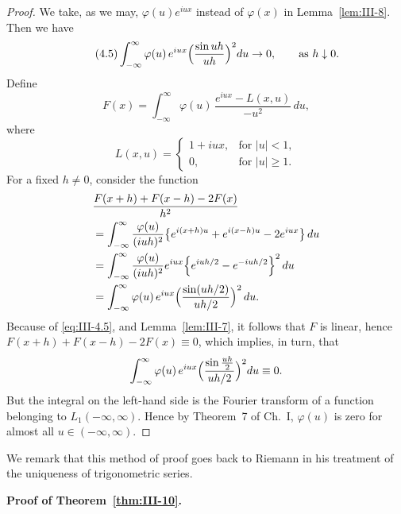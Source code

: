 \begin{proof}
We take, as we may, $\varphi(u)e^{iux}$ instead of $\varphi(x)$ in Lemma~\ref{lem:III-8}. Then we have
\begin{equation}\tag{4.5}\label{eq:III-4.5}
\int_{-\infty}^{\infty}\varphi(u)\,e^{iux}\Bigl(\frac{\sin uh}{uh}\Bigr)^{2}du\to0,\qquad\text{as }h\downarrow0.
\end{equation}
Define
\[
F(x)=\int_{-\infty}^{\infty}\varphi(u)\,\frac{e^{iux}-L(x,u)}{-u^{2}}\,du,
\]
where
\[
L(x,u)=
\begin{cases}
1+iux,&\text{for }|u|<1,\\
0,&\text{for }|u|\ge1.
\end{cases}
\]
For a fixed $h\neq0$, consider the function
\begin{align*}
&\frac{F(x+h)+F(x-h)-2F(x)}{h^{2}}\\
&=\int_{-\infty}^{\infty}\frac{\varphi(u)}{(iuh)^{2}}\bigl\{e^{i(x+h)u}+e^{i(x-h)u}-2e^{iux}\bigr\}\,du\\
&=\int_{-\infty}^{\infty}\frac{\varphi(u)}{(iuh)^{2}}e^{iux}\Bigl\{e^{iuh/2}-e^{-iuh/2}\Bigr\}^{2}\,du\\
&=\int_{-\infty}^{\infty}\varphi(u)\,e^{iux}\Bigl(\frac{\sin(uh/2)}{uh/2}\Bigr)^{2}\,du.
\end{align*}
Because of \eqref{eq:III-4.5}, and Lemma~\ref{lem:III-7}, it follows that $F$ is linear, hence $F(x+h)+F(x-h)-2F(x)\equiv0$, which implies, in turn, that
\[
\int_{-\infty}^{\infty}\varphi(u)\,e^{iux}\Bigl(\frac{\sin\frac{uh}{2}}{uh/2}\Bigr)^{2}du\equiv0.
\]
But the integral on the left-hand side is the Fourier transform of a function belonging to $L_{1}(-\infty,\infty)$. Hence by Theorem~7 of Ch.~I, $\varphi(u)$ is zero for almost all $u\in(-\infty,\infty)$.
\end{proof}

We remark that this method of proof goes back to Riemann in his treatment of the uniqueness of trigonometric series.

\noindent\textbf{Proof of Theorem~\ref{thm:III-10}.}

